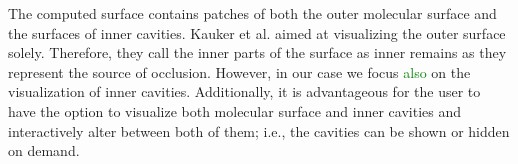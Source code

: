 
The computed surface contains patches of both the outer molecular surface and the surfaces of inner cavities.
Kauker et al. \cite{kauker2013rendering} aimed at visualizing the outer surface solely.
Therefore, they call the inner parts of the surface as inner remains as they represent the source of occlusion.
However, in our case we focus \textcolor{green}{also} on the visualization of inner cavities.
Additionally, it is advantageous for the user to have the option to visualize both molecular surface and inner cavities and interactively alter between both of them; i.e., the cavities can be shown or hidden on demand.

